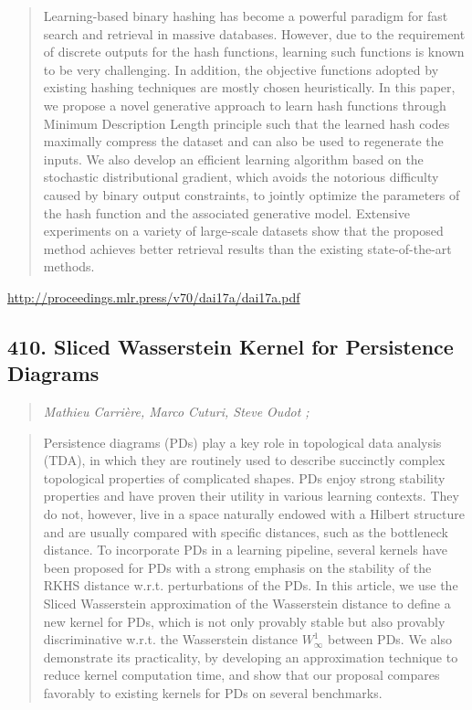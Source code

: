\documentclass{article}
\begin{document}
\begin{quote}
    Learning-based binary hashing has become a powerful paradigm for fast search and retrieval in massive databases. However, due to the requirement of discrete outputs for the hash functions, learning such functions is known to be very challenging. In addition, the objective functions adopted by existing hashing techniques are mostly chosen heuristically. In this paper, we propose a novel generative approach to learn hash functions through Minimum Description Length principle such that the learned hash codes maximally compress the dataset and can also be used to regenerate the inputs. We also develop an efficient learning algorithm based on the stochastic distributional gradient, which avoids the notorious difficulty caused by binary output constraints, to jointly optimize the parameters of the hash function and the associated generative model. Extensive experiments on a variety of large-scale datasets show that the proposed method achieves better retrieval results than the existing state-of-the-art methods.  
\end{quote}

\href{http://proceedings.mlr.press/v70/dai17a/dai17a.pdf}{http://proceedings.mlr.press/v70/dai17a/dai17a.pdf}

\subsection{410. Sliced Wasserstein Kernel for Persistence Diagrams}

\begin{quote}
\footnotesize{\textit{Mathieu Carrière, Marco Cuturi, Steve Oudot ;}}

\end{quote}

\begin{quote}
    Persistence diagrams (PDs) play a key role in topological data analysis (TDA), in which they are routinely used to describe succinctly complex topological properties of complicated shapes. PDs enjoy strong stability properties and have proven their utility in various learning contexts. They do not, however, live in a space naturally endowed with a Hilbert structure and are usually compared with specific distances, such as the bottleneck distance. To incorporate PDs in a learning pipeline, several kernels have been proposed for PDs with a strong emphasis on the stability of the RKHS distance w.r.t. perturbations of the PDs. In this article, we use the Sliced Wasserstein approximation of the Wasserstein distance to define a new kernel for PDs, which is not only provably stable but also provably discriminative w.r.t. the Wasserstein distance $W^1_\infty$ between PDs. We also demonstrate its practicality, by developing an approximation technique to reduce kernel computation time, and show that our proposal compares favorably to existing kernels for PDs on several benchmarks.  
\end{quote}
\end{document}
